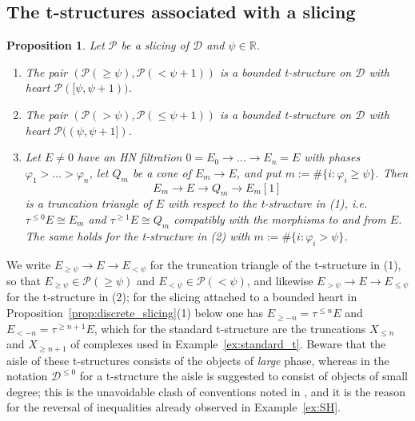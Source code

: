 \documentclass[12pt]{amsart}
\newtheorem{proposition}[theorem]{Proposition}
\numberwithin{theorem}{section}
\theoremstyle{definition}
\newcommand{\RR}{\mathbb{R}}
\newcommand{\calP}{\mathcal{P}}
\newcommand{\calD}{\mathcal{D}}
\newcommand{\Dle}[1]{\calD^{\leqslant #1}}
\begin{document}
	\subsection{The t-structures associated with a slicing}

	\begin{proposition}
		\label{prop:slicing_t}
		Let $\calP$ be a slicing of $\calD$ and $\psi \in \RR$.
		\begin{enumerate}
			\item The pair $(\calP(\geqslant \psi), \calP(< \psi + 1))$ is a bounded t-structure on $\calD$ with heart $\calP([\psi, \psi + 1))$.
			\item The pair $(\calP(> \psi), \calP(\leqslant \psi + 1))$ is a bounded t-structure on $\calD$ with heart $\calP((\psi, \psi + 1])$.
			\item Let $E \neq 0$ have an HN filtration $0 = E_0 \to \ldots \to E_n = E$ with phases $\varphi_1 > \ldots > \varphi_n$, let $Q_m$ be a cone of $E_m \to E$, and put $m := \# \{ i : \varphi_i \geqslant \psi \}$.
			Then
			\[
			E_m \to E \to Q_m \to E_m[1]
			\]
			is a truncation triangle of $E$ with respect to the t-structure in (1), i.e.\ $\tau^{\leqslant 0} E \cong E_m$ and $\tau^{\geqslant 1} E \cong Q_m$ compatibly with the morphisms to and from $E$.
			The same holds for the t-structure in (2) with $m := \# \{ i : \varphi_i > \psi \}$.
		\end{enumerate}
	\end{proposition}

	We write $E_{\geqslant \psi} \to E \to E_{< \psi}$ for the truncation triangle of the t-structure in (1), so that $E_{\geqslant \psi} \in \calP(\geqslant \psi)$ and $E_{< \psi} \in \calP(< \psi)$, and likewise $E_{> \psi} \to E \to E_{\leqslant \psi}$ for the t-structure in (2);
	for the slicing attached to a bounded heart in Proposition~\ref{prop:discrete_slicing}(1) below one has $E_{\geqslant -n} = \tau^{\leqslant n} E$ and $E_{< -n} = \tau^{\geqslant n + 1} E$, which for the standard t-structure are the truncations $X_{\leqslant n}$ and $X_{\geqslant n + 1}$ of complexes used in Example~\ref{ex:standard_t}.
	Beware that the aisle of these t-structures consists of the objects of \emph{large} phase, whereas in the notation $\Dle{0}$ for a t-structure the aisle is suggested to consist of objects of small degree;
	this is the unavoidable clash of conventions noted in \cite[footnote in \S 3]{Bri07}, and it is the reason for the reversal of inequalities already observed in Example~\ref{ex:SH}.
\end{document}
